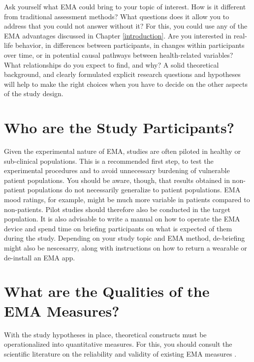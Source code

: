 \documentclass[]{book}
\begin{document}
Ask yourself what EMA could bring to your topic of interest. How is it
different from traditional assessment methods? What questions does it
allow you to address that you could not answer without it? For this, you
could use any of the EMA advantages discussed in Chapter
\ref{introduction}. Are you interested in real-life behavior, in
differences between participants, in changes within participants over
time, or in potential causal pathways between health-related variables?
What relationships do you expect to find, and why? A solid theoretical
background, and clearly formulated explicit research questions and
hypotheses will help to make the right choices when you have to decide
on the other aspects of the study design.

\section{Who are the Study
Participants?}\label{who-are-the-study-participants}

Given the experimental nature of EMA, studies are often piloted in
healthy or sub-clinical populations. This is a recommended first step,
to test the experimental procedures and to avoid unnecessary burdening
of vulnerable patient populations. You should be aware, though, that
results obtained in non-patient populations do not necessarily
generalize to patient populations. EMA mood ratings, for example, might
be much more variable in patients compared to non-patients. Pilot
studies should therefore also be conducted in the target population. It
is also advisable to write a manual on how to operate the EMA device and
spend time on briefing participants on what is expected of them during
the study. Depending on your study topic and EMA method, de-briefing
might also be nescesarry, along with instructions on how to return a
wearable or de-install an EMA app.

\section{What are the Qualities of the EMA
Measures?}\label{what-are-the-qualities-of-the-ema-measures}

  

With the study hypotheses in place, theoretical constructs must be
operationalized into quantitative measures. For this, you should consult
the scientific literature on the reliability and validity of existing
EMA measures \citep[e.g.,][]{Moore2016, Rijsbergen2012}.
\end{document}
